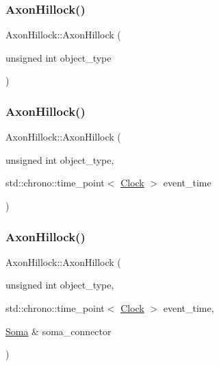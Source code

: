 \mbox{\label{classAxonHillock_a20a4da0885f32bfca34ab5cda2a13562}} 
\subsubsection{\texorpdfstring{Axon\+Hillock()}{AxonHillock()}\hspace{0.1cm}{\footnotesize\ttfamily [2/4]}}
{\footnotesize\ttfamily Axon\+Hillock\+::\+Axon\+Hillock (\begin{DoxyParamCaption}\item[{unsigned int}]{object\+\_\+type }\end{DoxyParamCaption})\hspace{0.3cm}{\ttfamily [inline]}}

\mbox{\label{classAxonHillock_acc61c61c8dfddd603e868a2fcbfd5e9c}} 
\subsubsection{\texorpdfstring{Axon\+Hillock()}{AxonHillock()}\hspace{0.1cm}{\footnotesize\ttfamily [3/4]}}
{\footnotesize\ttfamily Axon\+Hillock\+::\+Axon\+Hillock (\begin{DoxyParamCaption}\item[{unsigned int}]{object\+\_\+type,  }\item[{std\+::chrono\+::time\+\_\+point$<$ \mbox{\hyperlink{universe_8h_a0ef8d951d1ca5ab3cfaf7ab4c7a6fd80}{Clock}} $>$}]{event\+\_\+time }\end{DoxyParamCaption})\hspace{0.3cm}{\ttfamily [inline]}}

\mbox{\label{classAxonHillock_a250945e24a51475369b6c7881c0d955b}} 
\subsubsection{\texorpdfstring{Axon\+Hillock()}{AxonHillock()}\hspace{0.1cm}{\footnotesize\ttfamily [4/4]}}
{\footnotesize\ttfamily Axon\+Hillock\+::\+Axon\+Hillock (\begin{DoxyParamCaption}\item[{unsigned int}]{object\+\_\+type,  }\item[{std\+::chrono\+::time\+\_\+point$<$ \mbox{\hyperlink{universe_8h_a0ef8d951d1ca5ab3cfaf7ab4c7a6fd80}{Clock}} $>$}]{event\+\_\+time,  }\item[{\mbox{\hyperlink{classSoma}{Soma}} \&}]{soma\+\_\+connector }\end{DoxyParamCaption})\hspace{0.3cm}{\ttfamily [inline]}}


